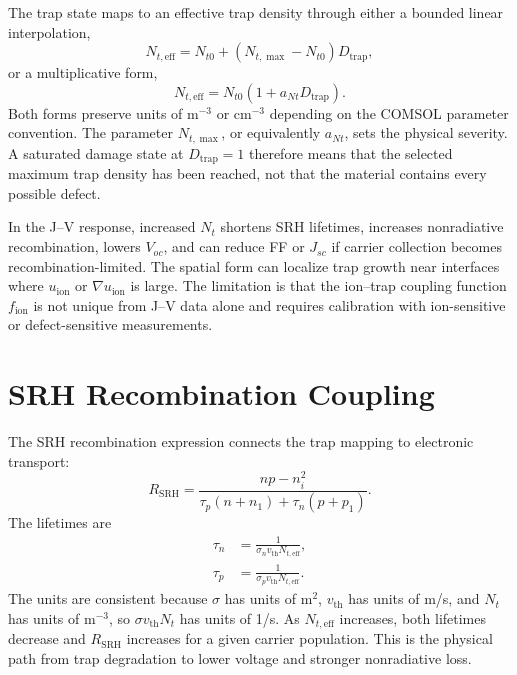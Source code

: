 The trap state maps to an effective trap density through either a bounded
linear interpolation,
\begin{equation}
N_{t,\mathrm{eff}} =
N_{t0} + (N_{t,\max}-N_{t0})D_{\mathrm{trap}},
\label{eq:nt_linear}
\end{equation}
or a multiplicative form,
\begin{equation}
N_{t,\mathrm{eff}} =
N_{t0}\left(1+a_{Nt}D_{\mathrm{trap}}\right).
\label{eq:nt_mult}
\end{equation}
Both forms preserve units of m$^{-3}$ or cm$^{-3}$ depending on the COMSOL
parameter convention. The parameter $N_{t,\max}$, or equivalently $a_{Nt}$,
sets the physical severity. A saturated damage state at
$D_{\mathrm{trap}}=1$ therefore means that the selected maximum trap density
has been reached, not that the material contains every possible defect.

In the J--V response, increased $N_t$ shortens SRH lifetimes, increases
nonradiative recombination, lowers $V_{oc}$, and can reduce FF or $J_{sc}$ if
carrier collection becomes recombination-limited. The spatial form can localize
trap growth near interfaces where $u_{\mathrm{ion}}$ or
$\nabla u_{\mathrm{ion}}$ is large. The limitation is that the ion--trap
coupling function $f_{\mathrm{ion}}$ is not unique from J--V data alone and
requires calibration with ion-sensitive or defect-sensitive measurements.

\section{SRH Recombination Coupling}

The SRH recombination expression connects the trap mapping to electronic
transport:
\begin{equation}
R_{\mathrm{SRH}} =
\frac{np-n_i^2}
{\tau_p(n+n_1)+\tau_n(p+p_1)}.
\end{equation}
The lifetimes are
\begin{align}
\tau_n &= \frac{1}{\sigma_n v_{\mathrm{th}} N_{t,\mathrm{eff}}},\\
\tau_p &= \frac{1}{\sigma_p v_{\mathrm{th}} N_{t,\mathrm{eff}}}.
\end{align}
The units are consistent because $\sigma$ has units of m$^2$,
$v_{\mathrm{th}}$ has units of m/s, and $N_t$ has units of m$^{-3}$, so
$\sigma v_{\mathrm{th}}N_t$ has units of 1/s. As
$N_{t,\mathrm{eff}}$ increases, both lifetimes decrease and
$R_{\mathrm{SRH}}$ increases for a given carrier population. This is the
physical path from trap degradation to lower voltage and stronger nonradiative
loss.


